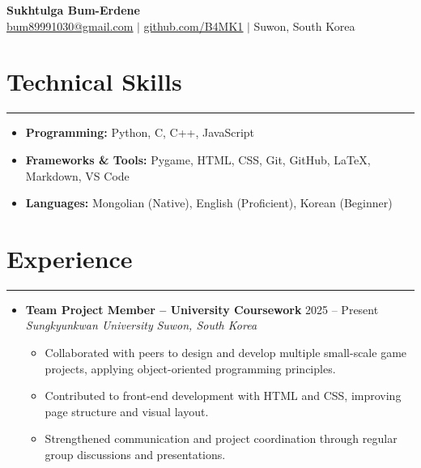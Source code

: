 \documentclass[letterpaper, 10pt]{article}
\begin{document}
\begin{center}
    \textbf{\LARGE Sukhtulga Bum-Erdene} \\ \vspace{2pt}
    \href{mailto:bum89991030@gmail.com}{\underline{bum89991030@gmail.com}} $|$
    \href{https://github.com/B4MK1}{\underline{github.com/B4MK1}} $|$
    Suwon, South Korea
\end{center}

\section*{Technical Skills}
\hrule
\vspace{4pt}
\begin{itemize}
    \item[] \textbf{Programming:} Python, C, C++, JavaScript
    \item[] \textbf{Frameworks \& Tools:} Pygame, HTML, CSS, Git, GitHub, LaTeX, Markdown, VS Code
    \item[] \textbf{Languages:} Mongolian (Native), English (Proficient), Korean (Beginner)
\end{itemize}

\section*{Experience}
\hrule
\vspace{4pt}
\begin{itemize}
    \item[]
        \textbf{Team Project Member -- University Coursework} \hfill 2025 -- Present \\
        \textit{Sungkyunkwan University} \hfill \textit{Suwon, South Korea}
        \begin{itemize}
            \item Collaborated with peers to design and develop multiple small-scale game projects, applying object-oriented programming principles.
            \item Contributed to front-end development with HTML and CSS, improving page structure and visual layout.
            \item Strengthened communication and project coordination through regular group discussions and presentations.
        \end{itemize}
\end{itemize}
\end{document}
